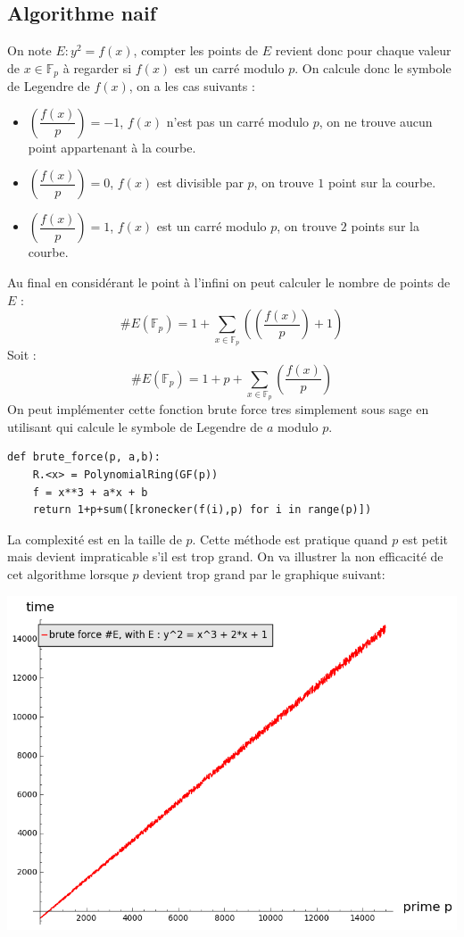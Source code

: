 \documentclass{article}
\begin{document}
\subsection{Algorithme naif}
On note $E: y^2 = f(x)$, compter les points de $E$ revient donc pour chaque valeur de $x \in \mathbb{F}_p$ à regarder si $f(x)$ est un carré modulo $p$. On calcule donc le symbole de Legendre de $f(x)$, on a les cas suivants : 
\begin{itemize}
\item  $\genfrac(){}{0}{f(x)}{p} = -1$, $f(x)$ n'est pas un carré modulo $p$, on ne trouve aucun point appartenant à la courbe.
\item $\genfrac(){}{0}{f(x)}{p} = 0$, $f(x)$ est divisible par $p$, on trouve $1$ point sur la courbe.
\item $\genfrac(){}{0}{f(x)}{p} = 1$, $f(x)$ est un carré modulo $p$, on trouve $2$ points sur la courbe.
\end{itemize}
\medskip
Au final en considérant le point à l'infini on peut calculer le nombre de points de $E$ : 
\begin{equation*}
\#E(\mathbb{F}_p) = 1 + \sum_{x \in \mathbb{F}_p}(\genfrac(){}{0}{f(x)}{p} + 1)
\end{equation*}
Soit : 
\begin{equation}
\#E(\mathbb{F}_p) = 1 + p +\sum_{x \in \mathbb{F}_p}\genfrac(){}{0}{f(x)}{p}
\end{equation}
On peut implémenter cette fonction brute force tres simplement sous sage en utilisant  qui calcule le symbole de Legendre de $a$ modulo $p$.
\medskip
\begin{lstlisting}
def brute_force(p, a,b):
    R.<x> = PolynomialRing(GF(p))
    f = x**3 + a*x + b
    return 1+p+sum([kronecker(f(i),p) for i in range(p)])

\end{lstlisting}

\bigskip
La complexité est en la taille de $p$. Cette méthode est pratique quand $p$ est petit mais devient impraticable s'il est trop grand.
On va illustrer la non efficacité de cet algorithme lorsque $p$ devient trop grand par le graphique suivant:

\includegraphics[scale=0.5]{pictures/brute_force_cputime.png} 
\end{document}

